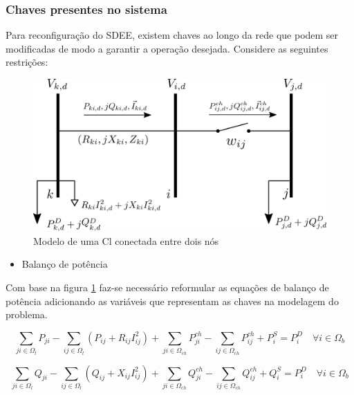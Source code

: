 \subsubsection{Chaves presentes no sistema}

Para reconfiguração do SDEE, existem chaves ao longo da rede que podem ser modificadas de modo a garantir a operação desejada.
Considere as seguintes restrições:

\begin{figure}[h]
    \centering
    \includegraphics[scale = 1.5]{01_img/diagrama_chaves.png}
    \caption{Modelo de uma Cl conectada entre dois nós}
    \label{fig:diagrama_chave}
\end{figure}
    
\begin{itemize}
    \item Balanço de potência
\end{itemize}
    Com base na figura \ref{fig:diagrama_chave} faz-se necessário reformular as equações de balanço de potência adicionando as variáveis que representam as chaves na modelagem do problema.
    
\begin{equation}
    \sum_{ji\in\Omega_{l}}P_{ji} - \sum_{ij\in\Omega_{l}}(P_{ij} + R_{ij}I_{ij}^{2})+ \sum_{ji\in\Omega_{ch}}P_{ji}^{ch} -\sum_{ij\in\Omega_{ch}}P_{ij}^{ch} + P_{i}^{S} = P_{i}^{D}\quad\forall i \in\Omega_{b}\label{eq:fluxo_pot_ativa_chaves}  
\end{equation}
    
    
\begin{equation}
    \sum_{ji\in\Omega_{l}}Q_{ji} - \sum_{ij\in\Omega_{l}}(Q_{ij} + X_{ij}I_{ij}^{2})+ \sum_{ji\in\Omega_{ch}}Q_{ji}^{ch} -\sum_{ij\in\Omega_{ch}}Q_{ij}^{ch} + Q_{i}^{S} = P_{i}^{D}\quad\forall i \in\Omega_{b}
    \label{eq:fluxo_pot_reativa_chaves}
\end{equation}
    
